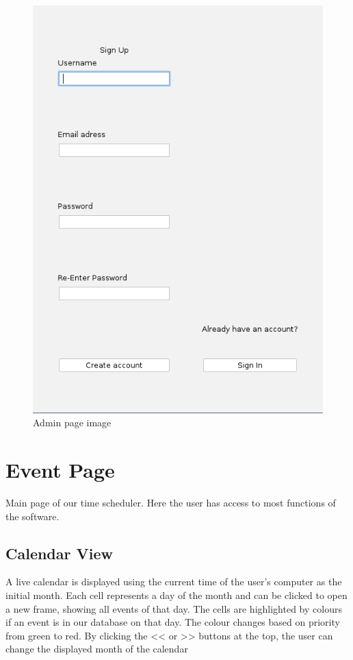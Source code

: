 \begin{figure}[ht]
	\centering
	\includegraphics[scale=0.5,keepaspectratio]{Figures/sign_up.png}
	 \caption{Admin page image}
     \label{fig:adminPage}
\end{figure}

\section{Event Page}
Main page of our time scheduler. Here the user has access to most functions of the software.
\subsection{Calendar View}
A live calendar is displayed using the current time of the user's computer as the initial month. Each cell represents a day of the month and can be clicked to open a new frame, showing all events of that day. The cells are highlighted by colours if an event is in our database on that day. The colour changes based on priority from green to red. By clicking the << or >> buttons at the top, the user can change the displayed month of the calendar

